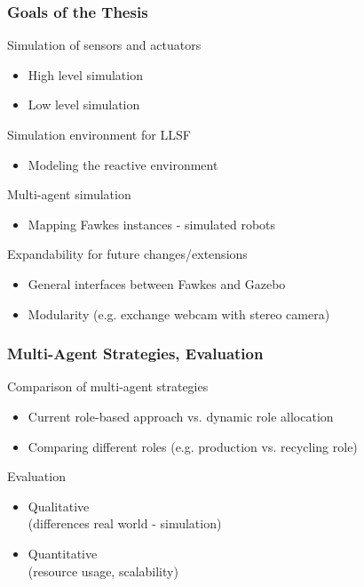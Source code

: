 \documentclass[]{beamer}
\begin{document}
\begin{frame}
  \frametitle{Goals of the Thesis}
  Simulation of sensors and actuators
  \begin{itemize}
  \item High level simulation
  \item Low level simulation
  \end{itemize}
  \pause
  Simulation environment for LLSF
  \begin{itemize}
  \item Modeling the reactive environment
  \end{itemize}
  \pause
  Multi-agent simulation
  \begin{itemize}
  \item Mapping Fawkes instances - simulated robots
  \end{itemize}
  \pause
  Expandability for future changes/extensions
  \begin{itemize}
  \item General interfaces between Fawkes and Gazebo
  \item Modularity (e.g. exchange webcam with stereo camera)
  \end{itemize}
\end{frame}

\begin{frame}
  \frametitle{Multi-Agent Strategies, Evaluation}
  Comparison of multi-agent strategies
  \begin{itemize}
  \item Current role-based approach vs. dynamic role allocation
  \item Comparing different roles (e.g. production vs. recycling role)
  \end{itemize}
  \pause
  Evaluation
  \begin{itemize}
  \item Qualitative\\(differences real world - simulation)
  \item Quantitative\\(resource usage, scalability)
  \end{itemize}
\end{frame}
\end{document}
